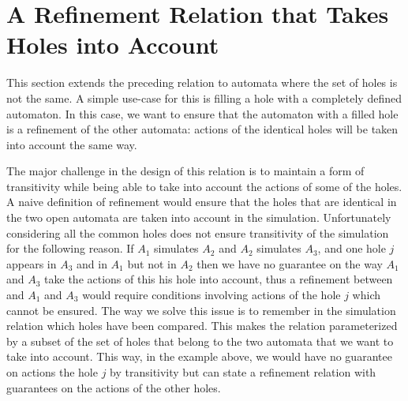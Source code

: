 \documentclass[runningheads]{llncs}
\begin{document}






\section{A Refinement Relation that Takes Holes into Account}\label{sec:holes}

This section  extends the preceding relation to automata where the set of holes is not the same. A simple use-case for this is filling a hole with a completely defined automaton. In this case, we want to ensure that the automaton with a filled hole is a refinement of the other automata: actions of the identical holes will be taken into account the same way.

The major challenge in the design of this relation is to maintain a form of transitivity while being able to take into account the actions of some of the holes. A naive definition of refinement would ensure that the holes that are identical in the two open automata are taken into account in the simulation. Unfortunately considering all the common holes does not ensure transitivity of the simulation for the following reason. If $A_1$ simulates $A_2$ and $A_2$ simulates $A_3$, and one hole $j$ appears in $A_3$ and in $A_1$ but not in $A_2$ then we have no guarantee on the way $A_1$ and $A_3$ take the actions of this his hole into account, thus  a refinement between and $A_1$ and $A_3$ would require conditions involving actions of the hole $j$ which cannot be ensured. The way we solve this issue is to remember in the simulation relation which holes have been compared. This makes the relation parameterized by a subset of the set of holes that belong to the two automata that we want to take into account.
This way, in the example above, we would have no guarantee on actions the hole $j$ by transitivity but can state a refinement relation with guarantees on the actions of the other holes.
\end{document}
